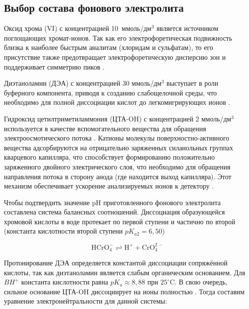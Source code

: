 \subsection{Выбор состава фонового электролита}

Оксид хрома (VI) с концентрацией 10~ммоль/дм$^3$ является источником поглощающих хромат-ионов. Так как его электрофоретическая подвижность близка к наиболее быстрым аналитам (хлоридам и сульфатам), то его присутствие также предотвращает электрофоретическую дисперсию зон и поддерживает симметрию пиков \cite{pndf14123428218, komarova2006prakticheskoe}.

Диэтаноламин (ДЭА) с концентрацией 30 ммоль/дм$^3$ выступает в роли буферного компонента, приводя к созданию слабощелочной среды, что необходимо для полной диссоциации кислот до легкомигрирующих ионов \cite{komarova2006prakticheskoe, shelekhovaOpredelenieAnionovNeorganicheskikh2023}.

Гидроксид цетилтриметиламмония (ЦТА-OH) с концентрацией 2 ммоль/дм$^3$ используется в качестве вспомогательного вещества для обращения электроосмотического потока \cite{pndf14123428218}. Катионы молекулы поверхностно-активного вещества адсорбируются на отрицательно заряженных силанольных группах кварцевого капилляра, что способствует формированию положительно заряженного двойного электрического слоя, что необходимо для обращения направления потока в сторону анода (где находится выход капилляра). Этот механизм обеспечивает ускорение анализируемых ионов к детектору \cite{komarova2006prakticheskoe, pobozyApplicationCapillaryElectrophoresis2021b}.

Чтобы подтвердить значение pH приготовленного фонового электролита составлена система балансных соотношений. Диссоциация образующейся хромовой кислоты в воде протекает по первой ступени и частично по второй (константа кислотности второй ступени $pK_{a2} = 6{,}50$)

\begin{equation}
	\text{HCrO}_4^- \rightleftharpoons \text{H}^+ + \text{CrO}_4^{2-}
\end{equation}

Протонирование ДЭА определяется константой диссоциации сопряжённой кислоты, так как диэтаноламин является слабым органическим основанием. Для $BH^+$ константа кислотности равна $pK_a \approx 8,88$ при $25^\circ\text{C}$. В свою очередь, сильное основание ЦТА-OH диссоциирует на ионы полностью \cite{komarova2006prakticheskoe}. Тогда составим уравнение электронейтральности для данной системы:


